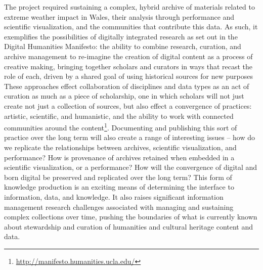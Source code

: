 \documentclass[amsthm,ebook]{saparticle}
\begin{document}
The project required sustaining a complex, hybrid archive of materials related to extreme weather impact in Wales, their analysis through performance and scientific visualization, and the communities that contribute this data. As such, it exemplifies the possibilities of digitally integrated research as set out in the Digital Humanities Manifesto: the ability to combine research, curation, and archive management to re-imagine the creation of digital content as a process of creative making, bringing together scholars and curators in ways that recast the role of each, driven by a shared goal of using historical sources for new purposes These approaches effect collaboration of disciplines and data types as an act of curation as much as a piece of scholarship, one in which scholars will not just create not just a collection of sources, but also effect a convergence of practices: artistic, scientific, and humanistic, and the ability to work with connected communities around the content\footnote{\url{http://manifesto.humanities.ucla.edu/}}. Documenting and publishing this sort of practice over the long term will also create a range of interesting issues -- how do we replicate the relationships between archives, scientific visualization, and performance? How is provenance of archives retained when embedded in a scientific visualization, or a performance? How will the convergence of digital and born digital be preserved and replicated over the long term? This form of knowledge production is an exciting means of determining the interface to information, data, and knowledge. It also raises significant information management research challenges associated with managing and sustaining complex collections over time, pushing the boundaries of what is currently known about stewardship and curation of humanities and cultural heritage content and data.



\end{document}
